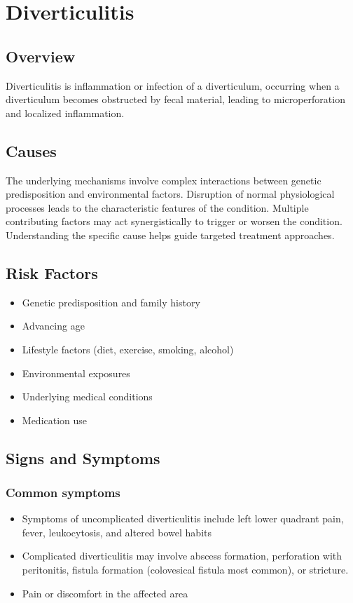 \chapter{Diverticulitis}
\label{sec:Diverticulitis}

\section{Overview}
Diverticulitis is inflammation or infection of a diverticulum, occurring when a diverticulum becomes obstructed by fecal material, leading to microperforation and localized inflammation.
\section{Causes}
The underlying mechanisms involve complex interactions between genetic predisposition and environmental factors. Disruption of normal physiological processes leads to the characteristic features of the condition. Multiple contributing factors may act synergistically to trigger or worsen the condition. Understanding the specific cause helps guide targeted treatment approaches.
\section{Risk Factors}


\begin{itemize}[noitemsep]
  \item Genetic predisposition and family history
  \item Advancing age
  \item Lifestyle factors (diet, exercise, smoking, alcohol)
  \item Environmental exposures
  \item Underlying medical conditions
  \item Medication use
\end{itemize}
\section{Signs and Symptoms}

\subsection{Common symptoms}
\begin{itemize}[noitemsep]
  \item Symptoms of uncomplicated diverticulitis include left lower quadrant pain, fever, leukocytosis, and altered bowel habits
  \item Complicated diverticulitis may involve abscess formation, perforation with peritonitis, fistula formation (colovesical fistula most common), or stricture.
  \item Pain or discomfort in the affected area
  \end{itemize}

